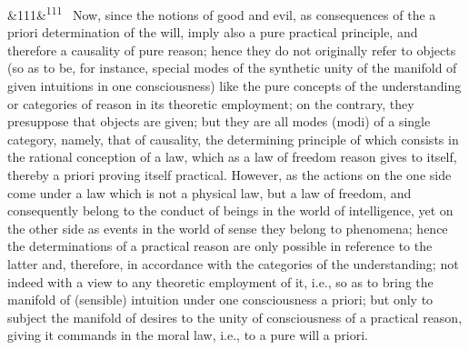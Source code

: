 \documentclass[12pt]{article}
\newcommand{\para}[1][]{\par\noindent\ifx&#1&\else\textsuperscript{\footnotesize #1}~\fi}
\begin{document}
\para[111] Now, since the notions of good and evil, as consequences of the a priori determination of the will, imply also a pure practical principle, and therefore a causality of pure reason; hence they do not originally refer to objects (so as to be, for instance, special modes of the synthetic unity of the manifold of given intuitions in one consciousness) like the pure concepts of the understanding or categories of reason in its theoretic employment; on the contrary, they presuppose that objects are given; but they are all modes (modi) of a single category, namely, that of causality, the determining principle of which consists in the rational conception of a law, which as a law of freedom reason gives to itself, thereby a priori proving itself practical. However, as the actions on the one side come under a law which is not a physical law, but a law of freedom, and consequently belong to the conduct of beings in the world of intelligence, yet on the other side as events in the world of sense they belong to phenomena; hence the determinations of a practical reason are only possible in reference to the latter and, therefore, in accordance with the categories of the understanding; not indeed with a view to any theoretic employment of it, i.e., so as to bring the manifold of (sensible) intuition under one consciousness a priori; but only to subject the manifold of desires to the unity of consciousness of a practical reason, giving it commands in the moral law, i.e., to a pure will a priori.
\end{document}
